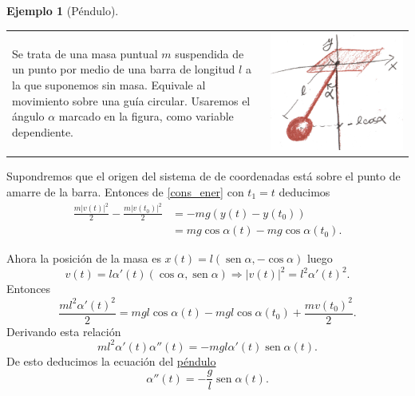 \documentclass{article}
\DeclareMathOperator{\sen}{sen}
\newtheorem{ejemplo}{Ejemplo}}
\begin{document}
\begin{ejemplo}[Péndulo]
\end{ejemplo}

\noindent\begin{tabular}{m{6cm} m{5.5cm}}
  Se trata de una masa puntual $m$ suspendida de un punto por medio de una barra de longitud $l$
 a la que suponemos sin masa. Equivale al movimiento sobre una guía circular.  Usaremos el ángulo $\alpha$ marcado en la figura, como variable dependiente.
 & \includegraphics[scale=.07]{imagenes/pendulo.jpg} \\
\end{tabular}

Supondremos que el origen del sistema de de coordenadas está sobre el punto de amarre de la barra. Entonces de \eqref{cons_ener} con $t_1=t$ deducimos 
\[\begin{split}\frac{m|v(t)|^2}{2}-\frac{m|v(t_0)|^2}{2}&=-mg\left(y(t)-y(t_0)\right)\\
  &=mg\cos\alpha(t)-mg\cos\alpha(t_0).
   \end{split}
\]



Ahora la posición de la masa es $x(t)=l(\sen\alpha,-\cos\alpha)$ luego 
\[v(t)=l\alpha'(t)(\cos\alpha,\sen\alpha) \Longrightarrow |v(t)|^2=l^2\alpha'(t)^2.\]
Entonces
\[\frac{ml^2\alpha'(t)^2}{2}= mgl\cos\alpha(t)-mgl\cos\alpha(t_0) +\frac{mv(t_0)^2}{2}.\]
Derivando esta relación
\[ml^2\alpha'(t)\alpha''(t)=-mgl\alpha'(t)\sen\alpha(t).\]
De esto deducimos la ecuación del \href{http://es.wikipedia.org/wiki/Péndulo}{péndulo}
\[\boxed{\alpha''(t)=-\frac{g}{l}\sen\alpha(t)}.\]
\end{document}
